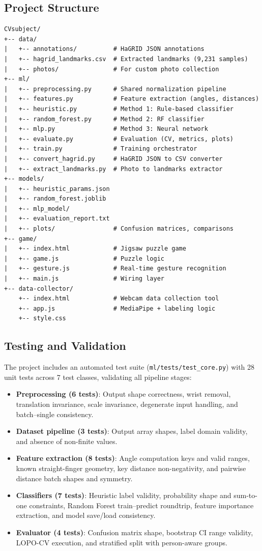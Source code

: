 \documentclass[11pt,a4paper]{article}
\begin{document}
\subsection{Project Structure}

\begin{lstlisting}
CVsubject/
+-- data/
|   +-- annotations/          # HaGRID JSON annotations
|   +-- hagrid_landmarks.csv  # Extracted landmarks (9,231 samples)
|   +-- photos/               # For custom photo collection
+-- ml/
|   +-- preprocessing.py      # Shared normalization pipeline
|   +-- features.py           # Feature extraction (angles, distances)
|   +-- heuristic.py          # Method 1: Rule-based classifier
|   +-- random_forest.py      # Method 2: RF classifier
|   +-- mlp.py                # Method 3: Neural network
|   +-- evaluate.py           # Evaluation (CV, metrics, plots)
|   +-- train.py              # Training orchestrator
|   +-- convert_hagrid.py     # HaGRID JSON to CSV converter
|   +-- extract_landmarks.py  # Photo to landmarks extractor
+-- models/
|   +-- heuristic_params.json
|   +-- random_forest.joblib
|   +-- mlp_model/
|   +-- evaluation_report.txt
|   +-- plots/                # Confusion matrices, comparisons
+-- game/
|   +-- index.html            # Jigsaw puzzle game
|   +-- game.js               # Puzzle logic
|   +-- gesture.js            # Real-time gesture recognition
|   +-- main.js               # Wiring layer
+-- data-collector/
    +-- index.html            # Webcam data collection tool
    +-- app.js                # MediaPipe + labeling logic
    +-- style.css
\end{lstlisting}

\subsection{Testing and Validation}

The project includes an automated test suite (\texttt{ml/tests/test\_core.py}) with 28 unit tests across 7 test classes, validating all pipeline stages:

\begin{itemize}
    \item \textbf{Preprocessing (6 tests)}: Output shape correctness, wrist removal, translation invariance, scale invariance, degenerate input handling, and batch--single consistency.
    \item \textbf{Dataset pipeline (3 tests)}: Output array shapes, label domain validity, and absence of non-finite values.
    \item \textbf{Feature extraction (8 tests)}: Angle computation keys and valid ranges, known straight-finger geometry, key distance non-negativity, and pairwise distance batch shapes and symmetry.
    \item \textbf{Classifiers (7 tests)}: Heuristic label validity, probability shape and sum-to-one constraints, Random Forest train--predict roundtrip, feature importance extraction, and model save/load consistency.
    \item \textbf{Evaluator (4 tests)}: Confusion matrix shape, bootstrap CI range validity, LOPO-CV execution, and stratified split with person-aware groups.
\end{itemize}
\end{document}
